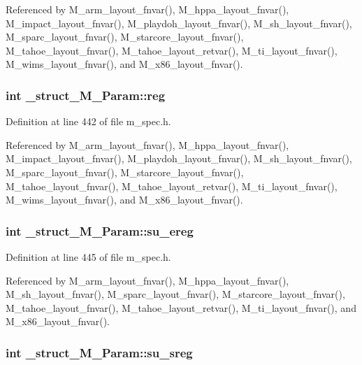 Referenced by M\_\-arm\_\-layout\_\-fnvar(), M\_\-hppa\_\-layout\_\-fnvar(), M\_\-impact\_\-layout\_\-fnvar(), M\_\-playdoh\_\-layout\_\-fnvar(), M\_\-sh\_\-layout\_\-fnvar(), M\_\-sparc\_\-layout\_\-fnvar(), M\_\-starcore\_\-layout\_\-fnvar(), M\_\-tahoe\_\-layout\_\-fnvar(), M\_\-tahoe\_\-layout\_\-retvar(), M\_\-ti\_\-layout\_\-fnvar(), M\_\-wims\_\-layout\_\-fnvar(), and M\_\-x86\_\-layout\_\-fnvar().
\subsubsection{\setlength{\rightskip}{0pt plus 5cm}int \bf{\_\-struct\_\-M\_\-Param::reg}}\label{struct__struct__M__Param_941eb1dd3b29a98073c5b28007356262}




Definition at line 442 of file m\_\-spec.h.

Referenced by M\_\-arm\_\-layout\_\-fnvar(), M\_\-hppa\_\-layout\_\-fnvar(), M\_\-impact\_\-layout\_\-fnvar(), M\_\-playdoh\_\-layout\_\-fnvar(), M\_\-sh\_\-layout\_\-fnvar(), M\_\-sparc\_\-layout\_\-fnvar(), M\_\-starcore\_\-layout\_\-fnvar(), M\_\-tahoe\_\-layout\_\-fnvar(), M\_\-tahoe\_\-layout\_\-retvar(), M\_\-ti\_\-layout\_\-fnvar(), M\_\-wims\_\-layout\_\-fnvar(), and M\_\-x86\_\-layout\_\-fnvar().
\subsubsection{\setlength{\rightskip}{0pt plus 5cm}int \bf{\_\-struct\_\-M\_\-Param::su\_\-ereg}}\label{struct__struct__M__Param_830e83a69c6e1ee8598a6dbe16225603}




Definition at line 445 of file m\_\-spec.h.

Referenced by M\_\-arm\_\-layout\_\-fnvar(), M\_\-hppa\_\-layout\_\-fnvar(), M\_\-sh\_\-layout\_\-fnvar(), M\_\-sparc\_\-layout\_\-fnvar(), M\_\-starcore\_\-layout\_\-fnvar(), M\_\-tahoe\_\-layout\_\-fnvar(), M\_\-tahoe\_\-layout\_\-retvar(), M\_\-ti\_\-layout\_\-fnvar(), and M\_\-x86\_\-layout\_\-fnvar().
\subsubsection{\setlength{\rightskip}{0pt plus 5cm}int \bf{\_\-struct\_\-M\_\-Param::su\_\-sreg}}\label{struct__struct__M__Param_41d01c58dea19fc292bc283fd0a1f824}




